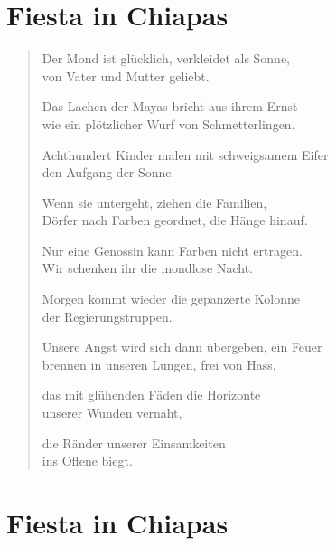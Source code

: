 
\cleartoverso

\section{Fiesta in Chiapas}

\vspace*{-1em}
\begin{verse}

Der Mond ist glücklich, verkleidet als Sonne,\\
von Vater und Mutter geliebt.

Das Lachen der Mayas bricht aus ihrem Ernst\\
wie ein plötzlicher Wurf von Schmetterlingen.

Achthundert Kinder malen mit schweigsamem Eifer\\
den Aufgang der Sonne.

Wenn sie untergeht, ziehen die Familien,\\
Dörfer nach Farben geordnet, die Hänge hinauf.

Nur eine Genossin kann Farben nicht ertragen.\\
Wir schenken ihr die mondlose Nacht.

Morgen kommt wieder die gepanzerte Kolonne\\
der Regierungstruppen.

Unsere Angst wird sich dann übergeben, ein Feuer\\
brennen in unseren Lungen, frei von Hass,

das mit glühenden Fäden die Horizonte\\
unserer Wunden vernäht,

die Ränder unserer Einsamkeiten\\
ins Offene biegt.

\end{verse}

\clearpage

\section{Fiesta in Chiapas}

